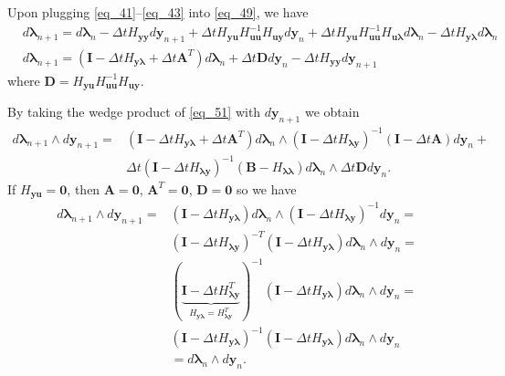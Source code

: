 \documentclass[a4paper, 10pt]{article}
\begin{document}
Upon plugging \eqref{eq_41}--\eqref{eq_43} into \eqref{eq_49}, we have
\begin{align}
    &  d\bm{\lambda}_{n+1} = d\bm{\lambda}_n - \Delta{t}H_{\bm{yy}}d\bm{y}_{n+1} + \Delta{t} H_{\bm{y u}}H_{\bm{uu}}^{-1}H_{\bm{uy}}d\bm{y}_{n} + \Delta{t} H_{\bm{y u}}H_{\bm{uu}}^{-1}H_{\bm{u\lambda}}d \bm{\lambda}_{n} -\Delta{t}  H_{\bm{y \lambda}}d\bm{\lambda}_{n} \\
    & d\bm{\lambda}_{n+1} = (\bm{I}-\Delta{t}H_{\bm{y\lambda}} + \Delta{t}\bm{A}^{T})d\bm{\lambda}_{n} + \Delta{t}\bm{D} d\bm{y}_n - \Delta{t}H_{\bm{yy}}d\bm{y}_{n+1} \label{eq_51}
\end{align}
where $\bm{D} = H_{\bm{yu}}H^{-1}_{\bm{uu}}H_{\bm{uy}}$.

By taking the wedge product of \eqref{eq_51} with $d\bm{y}_{n+1}$ we obtain
\begin{align*}
    d\bm{\lambda}_{n+1} \wedge d\bm{y}_{n+1} = & (\bm{I} - \Delta{t}H_{\bm{y\lambda}} + \Delta{t}\bm{A}^{T})d\bm{\lambda}_{n}\wedge (\bm{I}- \Delta{t}H_{\bm{\lambda y}})^{-1}(\bm{I} - \Delta{t}\bm{A})d\bm{y}_{n} + \\
    & \Delta{t}(\bm{I}- \Delta{t}H_{\bm{\lambda y}})^{-1}(\bm{B} - H_{\bm{\lambda \lambda}}) d\bm{\lambda}_{n} \wedge \Delta{t}\bm{D} d\bm{y}_{n}.
\end{align*}
If $H_{\bm{yu}} = \bm{0}$, then $\bm{A} = \bm{0}$, $\bm{A}^{T} = \bm{0}$, $\bm{D} = \bm{0}$ so we have
\begin{align}
    d\bm{\lambda}_{n+1} \wedge d\bm{y}_{n+1} = & (\bm{I} - \Delta{t}H_{\bm{y\lambda}})d\bm{\lambda}_{n}\wedge (\bm{I}- \Delta{t}H_{\bm{\lambda y}})^{-1}d\bm{y}_{n}  =  \\
    & (\bm{I}- \Delta{t}H_{\bm{\lambda y}})^{-T}(\bm{I} - \Delta{t}H_{\bm{y\lambda}}) d\bm{\lambda}_{n} \wedge d\bm{y}_{n} = \\
    & (\underbrace{\bm{I}- \Delta{t}H_{\bm{\lambda y}}^{T}}_{H_{\bm{y\lambda}} = H_{\bm{\lambda y}}^{T}})^{-1}(\bm{I} - \Delta{t}H_{\bm{y\lambda}}) d\bm{\lambda}_{n} \wedge d\bm{y}_{n}= \\
    & (\bm{I}- \Delta{t}H_{\bm{y \lambda}})^{-1}(\bm{I} - \Delta{t}H_{\bm{y\lambda}}) d\bm{\lambda}_{n} \wedge d\bm{y}_{n} \\
    & =  d\bm{\lambda}_{n} \wedge d\bm{y}_{n}.
\end{align}
\end{document}
